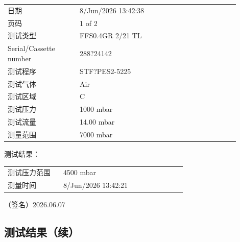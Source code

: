 \documentclass[UTF8,10pt,a4paper,fontset=fandol]{ctexart}
\newcommand{\fieldvalue}[1]{#1}
\newcommand{\handwritten}[1]{#1}
\begin{document}
\begin{tabular}{@{}p{0.28\linewidth}p{0.62\linewidth}@{}}
日期 &
\fieldvalue{8/Jun/2026 13:42:38}
\\
页码 &
\fieldvalue{1 of 2}
\\
测试类型 &
\fieldvalue{FFS0.4GR 2/21 TL}
\\
Serial/Cassette number &
\fieldvalue{288?24142}
\\
测试程序 &
\fieldvalue{STF?PES2-5225}
\\
测试气体 &
\fieldvalue{Air}
\\
测试区域 &
\fieldvalue{C}
\\
测试压力 &
\fieldvalue{1000 mbar}
\\
测试流量 &
\fieldvalue{14.00 mbar}
\\
测量范围 &
\fieldvalue{7000 mbar}
\\
\end{tabular}

\vspace{1em}

\noindent
测试结果：

\begin{tabular}{@{}p{0.28\linewidth}p{0.62\linewidth}@{}}
测试压力范围 &
\fieldvalue{4500 mbar}
\\
测量时间 &
\fieldvalue{8/Jun/2026 13:42:21}
\\
\end{tabular}

\vspace{2em}

\handwritten{（签名）2026.06.07}

\subsection{测试结果（续）}
\end{document}
